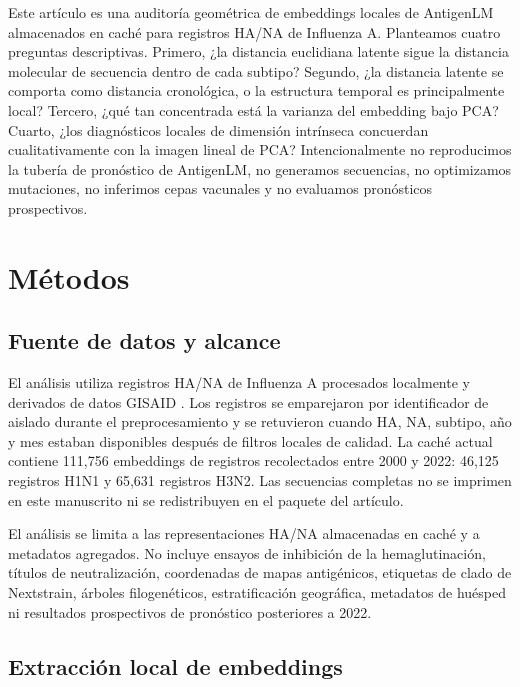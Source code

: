 \documentclass[11pt]{article}
\begin{document}
Este artículo es una auditoría geométrica de embeddings locales de AntigenLM almacenados en caché para registros HA/NA de Influenza A. Planteamos cuatro preguntas descriptivas. Primero, ¿la distancia euclidiana latente sigue la distancia molecular de secuencia dentro de cada subtipo? Segundo, ¿la distancia latente se comporta como distancia cronológica, o la estructura temporal es principalmente local? Tercero, ¿qué tan concentrada está la varianza del embedding bajo PCA? Cuarto, ¿los diagnósticos locales de dimensión intrínseca concuerdan cualitativamente con la imagen lineal de PCA? Intencionalmente no reproducimos la tubería de pronóstico de AntigenLM, no generamos secuencias, no optimizamos mutaciones, no inferimos cepas vacunales y no evaluamos pronósticos prospectivos.

\section{Métodos}

\subsection{Fuente de datos y alcance}

El análisis utiliza registros HA/NA de Influenza A procesados localmente y derivados de datos GISAID \cite{shu2017gisaid}. Los registros se emparejaron por identificador de aislado durante el preprocesamiento y se retuvieron cuando HA, NA, subtipo, año y mes estaban disponibles después de filtros locales de calidad. La caché actual contiene 111,756 embeddings de registros recolectados entre 2000 y 2022: 46,125 registros H1N1 y 65,631 registros H3N2. Las secuencias completas no se imprimen en este manuscrito ni se redistribuyen en el paquete del artículo.

El análisis se limita a las representaciones HA/NA almacenadas en caché y a metadatos agregados. No incluye ensayos de inhibición de la hemaglutinación, títulos de neutralización, coordenadas de mapas antigénicos, etiquetas de clado de Nextstrain, árboles filogenéticos, estratificación geográfica, metadatos de huésped ni resultados prospectivos de pronóstico posteriores a 2022.

\subsection{Extracción local de embeddings}
\end{document}
